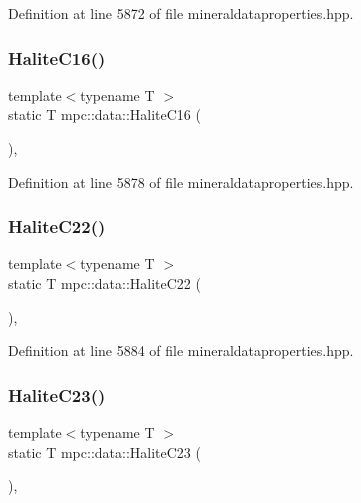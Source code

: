 Definition at line 5872 of file mineraldataproperties.\+hpp.

\mbox{\label{namespacempc_1_1data_a508adaf4e516f9477af72152e7848299}} 
\subsubsection{\texorpdfstring{Halite\+C16()}{HaliteC16()}}
{\footnotesize\ttfamily template$<$typename T $>$ \\
static T mpc\+::data\+::\+Halite\+C16 (\begin{DoxyParamCaption}{ }\end{DoxyParamCaption})\hspace{0.3cm}{\ttfamily [inline]}, {\ttfamily [static]}}



Definition at line 5878 of file mineraldataproperties.\+hpp.

\mbox{\label{namespacempc_1_1data_a56774b355f1755d9d0cca040a711f004}} 
\subsubsection{\texorpdfstring{Halite\+C22()}{HaliteC22()}}
{\footnotesize\ttfamily template$<$typename T $>$ \\
static T mpc\+::data\+::\+Halite\+C22 (\begin{DoxyParamCaption}{ }\end{DoxyParamCaption})\hspace{0.3cm}{\ttfamily [inline]}, {\ttfamily [static]}}



Definition at line 5884 of file mineraldataproperties.\+hpp.

\mbox{\label{namespacempc_1_1data_aed645d521765807bc0aea1c79af99656}} 
\subsubsection{\texorpdfstring{Halite\+C23()}{HaliteC23()}}
{\footnotesize\ttfamily template$<$typename T $>$ \\
static T mpc\+::data\+::\+Halite\+C23 (\begin{DoxyParamCaption}{ }\end{DoxyParamCaption})\hspace{0.3cm}{\ttfamily [inline]}, {\ttfamily [static]}}



